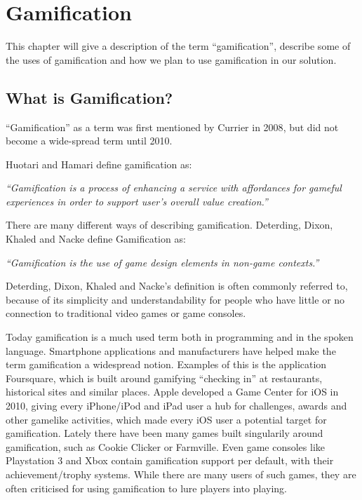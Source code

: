 \chapter{Gamification}
\label{chp:gamification}

This chapter will give a description of the term ``gamification'', describe some of the uses of gamification and how we plan to use gamification in our solution.

\section{What is Gamification?}
\label{sec:whatisgamification}
``Gamification'' as a term was first mentioned by Currier in 2008\cite{gamificationcurrier}, but did not become a wide-spread term until 2010. 

Huotari and Hamari\cite{huotari2012defining} define gamification as:

\textit{``Gamification is a process of enhancing a service with affordances for gameful experiences in order to support user's overall value creation.''}

There are many different ways of describing gamification. Deterding, Dixon, Khaled and Nacke\cite{Deterding:2011:GDE:2181037.2181040} define Gamification as:

\textit{``Gamification is the use of game design elements in non-game
contexts.''}

Deterding, Dixon, Khaled and Nacke's definition is often commonly referred to, because of its simplicity and understandability for people who have little or no connection to traditional video games or game consoles.

Today gamification is a much used term both in programming and in the spoken language. Smartphone applications and manufacturers have helped make the term gamification a widespread notion. Examples of this is the application Foursquare, which is built around gamifying ``checking in'' at restaurants, historical sites and similar places. Apple developed a Game Center for iOS in 2010, giving every iPhone/iPod and iPad user a hub for challenges, awards and other gamelike activities, which made every iOS user a potential target for gamification. Lately there have been many games built singularily around gamification, such as Cookie Clicker or Farmville. Even game consoles like Playstation 3 and Xbox contain gamification support per default, with their achievement/trophy systems. While there are many users of such games, they are often criticised for using gamification to lure players into playing. 


